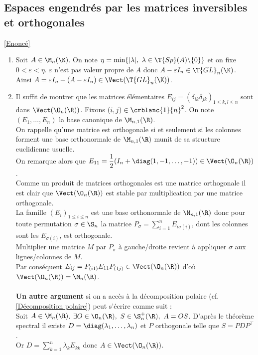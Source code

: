 \documentclass[8pt]{book}
\begin{document}
	\subsection{Espaces engendrés par les matrices inversibles et orthogonales }
	\label{Espaces engendrés par les matrice inversibles et orthogonales corrigé}
	\textcolor{blue}{\hyperref[Espaces engendrés par les matrices inversibles et orthogonales]{[Enoncé]}}\\
	\begin{enumerate}[leftmargin=*]
		\item Soit $A\in \M_n(\K)$. On note $\eta=\min\{|\lambda|,\ \lambda\in \T{Sp}(A)\backslash\{0\}\}$ et on fixe $0<\varepsilon<\eta$. $\varepsilon$ n'est pas valeur propre de $A$ donc $A-\varepsilon I_n\in \T{GL}_n(\K)$.\\
		Ainsi $A=\varepsilon I_n+(A-\varepsilon I_n)\in \Vect(\T{GL}_n(\K))$.
		\item Il suffit de montrer que les matrices élémentaires $E_{ij}=(\delta_{ik}\delta_{jk})_{1\leq k,l\leq n}$ sont dans $\Vect(\O_n(\R))$. Fixons $(i,j)\in \crblanc{1}{n}^2$. On note $(E_1,\dots,E_n)$ la base canonique de $\M_{n,1}(\R)$.\\
		On rappelle qu'une matrice est orthogonale si et seulement si les colonnes forment une base orthonormale de $\M_{n,1}(\R)$ munit de sa structure euclidienne usuelle.\\
		On remarque alors que $E_{11}=\dfrac{1}{2}(I_n+\diag(1,-1,\dots,-1))\in \Vect(\O_n(\R))$.\\
		Comme un produit de matrices orthogonales est une matrice orthogonale il est clair que $\Vect(\O_n(\R))$ est stable par multiplication par une matrice orthogonale.\\
		La famille $(E_i)_{1\leq i\leq n}$ est une base orthonormale de $\M_{n,1}(\R)$ donc pour toute permutation $\sigma\in \S_n$ la matrice $P_\sigma=\displaystyle\sum_{i=1}^nE_{i\sigma(i)}$, dont les colonnes sont les $E_{\sigma(i)}$, est orthogonale.\\
		Multiplier une matrice $M$ par $P_\sigma$ à gauche/droite revient à appliquer $\sigma$ aux lignes/colonnes de $M$.\\
		Par conséquent $E_{ij}=P_{(i1)}E_{11}P_{(1j)}\in \Vect(\O_n(\R))$ d'où $\Vect(\O_n(\R))=\M_n(\R)$.\\\\
		\textbf{Un autre argument} si on a accès à la décomposition polaire (cf.\ref{Décomposition polaire}) peut s'écrire comme suit :\\
		Soit $A\in \M_n(\R)$. $\exists O\in \O_n(\R),\ S\in \S_n^+(\R),\ A=OS$. D'après le théorème spectral il existe $D=\diag(\lambda_1,\dots,\lambda_n)$ et $P$ orthogonale telle que $S=PDP^\top$.\\
		Or $D=\displaystyle\sum_{k=1}^n\lambda_k E_{kk}$ donc $A\in \Vect(\O_n(\R))$.
	\end{enumerate}
	
\end{document}
